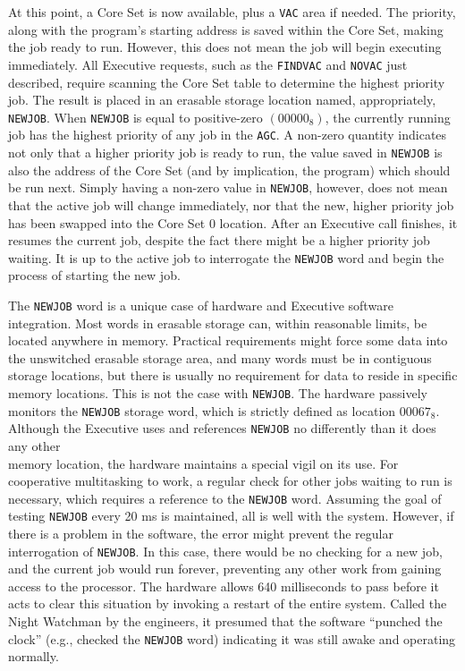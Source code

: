 \documentclass[refcap, oxford]{ahsan}
\begin{document}
At this point, a Core Set is now available, plus a \texttt{VAC} area if needed. The priority, along with the program's starting address is saved within the Core Set, making the job ready to run. However, this does not mean the job will begin executing immediately. All Executive requests, such as the \texttt{FINDVAC} and \texttt{NOVAC} just described, require scanning the Core Set table to determine the highest priority job. The result is placed in an erasable storage location named, appropriately, \texttt{NEWJOB}. When \texttt{NEWJOB} is equal to positive-zero $\left(00000_{8}\right)$, the currently running job has the highest priority of any job in the \texttt{AGC}. A non-zero quantity indicates not only that a higher priority job is ready to run, the value saved in \texttt{NEWJOB} is also the address of the Core Set (and by implication, the program) which should be run next. Simply having a non-zero value in \texttt{NEWJOB}, however, does not mean that the active job will change immediately, nor that the new, higher priority job has been swapped into the Core Set 0 location. After an Executive call finishes, it resumes the current job, despite the fact there might be a higher priority job waiting. It is up to the active job to interrogate the \texttt{NEWJOB} word and begin the process of starting the new job.

The \texttt{NEWJOB} word is a unique case of hardware and Executive software integration. Most words in erasable storage can, within reasonable limits, be located anywhere in memory. Practical requirements might force some data into the unswitched erasable storage area, and many words must be in contiguous storage locations, but there is usually no requirement for data to reside in specific memory locations. This is not the case with \texttt{NEWJOB}. The hardware passively monitors the \texttt{NEWJOB} storage word, which is strictly defined as location $00067_{8}$. Although the Executive uses and references \texttt{NEWJOB} no differently than it does any other\\
memory location, the hardware maintains a special vigil on its use. For cooperative multitasking to work, a regular check for other jobs waiting to run is necessary, which requires a reference to the \texttt{NEWJOB} word. Assuming the goal of testing \texttt{NEWJOB} every 20 ms is maintained, all is well with the system. However, if there is a problem in the software, the error might prevent the regular interrogation of \texttt{NEWJOB}. In this case, there would be no checking for a new job, and the current job would run forever, preventing any other work from gaining access to the processor. The hardware allows 640 milliseconds to pass before it acts to clear this situation by invoking a restart of the entire system. Called the Night Watchman by the engineers, it presumed that the software ``punched the clock'' (e.g., checked the \texttt{NEWJOB} word) indicating it was still awake and operating normally.
\end{document}
